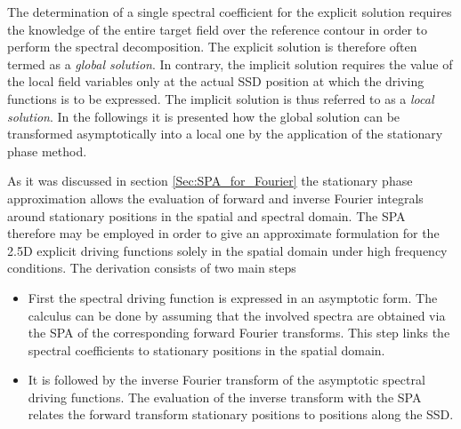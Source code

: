 The determination of a single spectral coefficient for the explicit solution requires the knowledge of the entire target field over the reference contour in order to perform the spectral decomposition. 
The explicit solution is therefore often termed as a \emph{global solution}.
In contrary, the implicit solution requires the value of the local field variables only at the actual SSD position at which the driving functions is to be expressed.
The implicit solution is thus referred to as a \emph{local solution}.
In the followings it is presented how the global solution can be transformed asymptotically into a local one by the application of the stationary phase method.

As it was discussed in section \ref{Sec:SPA_for_Fourier} the stationary phase approximation allows the evaluation of forward and inverse Fourier integrals around stationary positions in the spatial and spectral domain.
The SPA therefore may be employed in order to give an approximate formulation for the 2.5D explicit driving functions solely in the spatial domain under high frequency conditions.
The derivation consists of two main steps
\begin{itemize}
%
\item First the spectral driving function is expressed in an asymptotic form. 
The calculus can be done by assuming that the involved spectra are obtained via the SPA of the corresponding forward Fourier transforms. 
This step links the spectral coefficients to stationary positions in the spatial domain.
%
\item It is followed by the inverse Fourier transform of the asymptotic spectral driving functions.
The evaluation of the inverse transform with the SPA relates the forward transform stationary positions to positions along the SSD.
\end{itemize}

